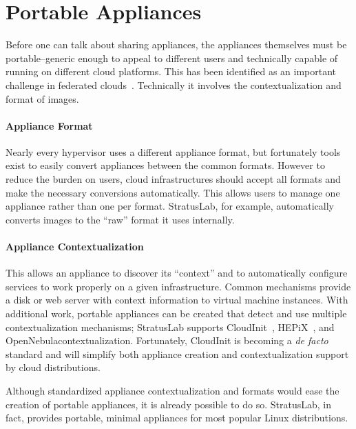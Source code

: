 \section{Portable Appliances}
\label{sec:portable-appliances}

Before one can talk about sharing appliances, the appliances
themselves must be portable--generic enough to appeal to different
users and technically capable of running on different cloud platforms.
This has been identified as an important challenge in federated
clouds~\cite{Petcu}. Technically it involves the contextualization and
format of images.

\paragraph*{Appliance Format}
Nearly every hypervisor uses a different appliance format, but
fortunately tools exist to easily convert appliances between the
common formats.  However to reduce the burden on users, cloud
infrastructures should accept all formats and make the necessary
conversions automatically.  This allows users to manage one appliance
rather than one per format.  StratusLab, for example, automatically
converts images to the ``raw'' format it uses internally. 

\paragraph*{Appliance Contextualization} This allows an appliance to
discover its ``context'' and to automatically configure services to
work properly on a given infrastructure.  Common mechanisms provide a
disk or web server with context information to virtual machine
instances.  With additional work, portable appliances can be created
that detect and use multiple contextualization mechanisms; StratusLab
supports CloudInit~\cite{cloudinit}, HEPiX~\cite{hepixbookcontext},
and OpenNebula\@ contextualization.  Fortunately, CloudInit is
becoming a {\em de facto} standard and will simplify both appliance
creation and contextualization support by cloud distributions.

Although standardized appliance contextualization and formats would ease
the creation of portable appliances, it is already possible to do so.
StratusLab, in fact, provides portable, minimal appliances for most
popular Linux distributions.
